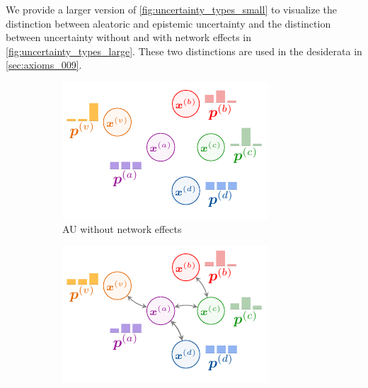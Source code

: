 We provide a larger version of \cref{fig:uncertainty_types_small} to visualize the distinction between aleatoric and epistemic uncertainty and the distinction between uncertainty without and with network effects in \cref{fig:uncertainty_types_large}. These two distinctions are used in the desiderata in \cref{sec:axioms_009}.

\begin{figure}[!h]
\centering
	\begin{subfigure}[t]{0.495\textwidth}
	    \centering
		\includegraphics[width=\textwidth]{sections/009_neurips2021/resources/no-network-aleatoric.pdf}
		\caption{AU without network effects} 
		\label{subfig:au_without_network_large}
	\end{subfigure}
	\begin{subfigure}[t]{0.495\textwidth}
	    \centering
		\includegraphics[width=\textwidth]{sections/009_neurips2021/resources/network-aleatoric.pdf}

\end{subfigure}
\end{figure}
